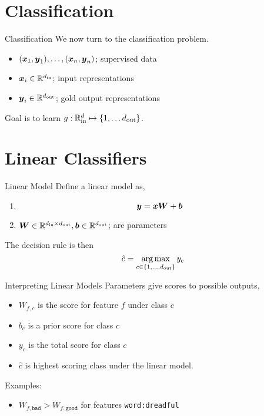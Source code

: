 \documentclass{beamer}
\begin{document}
\section{Classification}


\begin{frame}{Classification}
  We now turn to the classification problem.

  \begin{itemize}
  \item $(\boldsymbol{x}_1, \boldsymbol{y}_1), \ldots, (\boldsymbol{x}_n, \boldsymbol{y}_n)$; supervised data
  \item $\boldsymbol{x}_i \in \mathbb{R}^{d_{\mathrm{in}}}$;  input representations  
  \item $\boldsymbol{y}_i \in \mathbb{R}^{d_{\mathrm{out}}}$; gold output representations 
  \end{itemize}

  Goal is to learn $g: \mathbb{R}^d_{\mathrm{in}} \mapsto \{1,\ldots d_{\mathrm{out}}\}$.

\end{frame}


\section{Linear Classifiers}

\begin{frame}{Linear Model}
  Define a linear model as,
  \begin{enumerate}
  \item   \[\boldsymbol{y} = \boldsymbol{x} \boldsymbol{W} + \boldsymbol{b}\]   
  \item $\boldsymbol{W} \in \mathbb{R}^{d_{\mathrm{in}} \times d_{\mathrm{out}}}, \boldsymbol{b} \in \mathbb{R}^{d_{\mathrm{out}}}$; are parameters
  \end{enumerate}

  The decision rule is then 
  \[ \hat{c} = \argmax_{c \in \{ 1,\ldots, \dout\}} y_c \]
\end{frame}


\begin{frame}{Interpreting Linear Models}
  Parameters give scores to possible outputs,
  \begin{itemize}
  \item $W_{f, c}$ is the score for feature $f$ under class $c$
  \item $b_c$ is a prior score for class $c$  
  \item $y_c$ is the total score for class $c$
  \item $\hat{c}$ is highest scoring class under the linear model.
  \end{itemize}

  Examples:
  \begin{itemize}
  \item $W_{f,\texttt{bad}} > W_{f, \texttt{good}}$ for features \texttt{word:dreadful}
  \end{itemize}
\end{frame}
\end{document}
